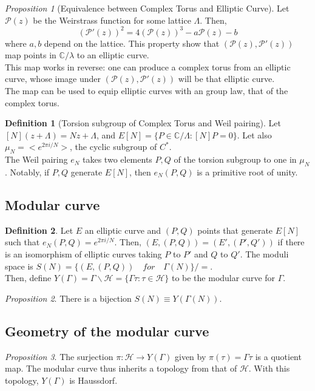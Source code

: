 \documentclass[11pt]{article}
\theoremstyle{definition}
\newtheorem{definition}{Definition}[section]
\theoremstyle{example}
\theoremstyle{remark}
\theoremstyle{lemma}
\theoremstyle{proposition}
\newtheorem{proposition}{Proposition}[section]
\theoremstyle{Problem}
\theoremstyle{Solution}
\theoremstyle{theorem}
\begin{document}
\begin{proposition}[Equivalence between Complex Torus and Elliptic Curve]
Let $\mathcal{P}(z)$ be the Weirstrass function for some lattice $\Lambda$. Then,
$$ (\mathcal{P}'(z))^2 = 4 (\mathcal{P}(z))^3 - a\mathcal{P}(z) - b$$
where $a,b$ depend on the lattice. This property show that $(\mathcal{P}(z), \mathcal{P}'(z))$ map points in $\mathbb{C}/\lambda$ to an elliptic curve.\\
This map works in reverse: one can produce a complex torus from an elliptic curve, whose image under $(\mathcal{P}(z), \mathcal{P}'(z))$ will be that elliptic curve.\\
The map can be used to equip elliptic curves with an group law, that of the complex torus.
\end{proposition}

\begin{definition}[Torsion subgroup of Complex Torus and Weil pairing]
Let $[N](z+\Lambda) = Nz + \Lambda$, and $E[N] = \{ P\in \mathbb{C}/\Lambda : [N]P = 0\}$. Let also $\mu_N = < e^{2\pi i/ N} >$, the cyclic subgroup of $C^*$.\\
The Weil pairing $e_N$ takes two elements $P,Q$ of the torsion subgroup to one in $\mu_N$. Notably, if $P,Q$ generate $E[N]$, then $e_N(P,Q)$ is a primitive root of unity.
\end{definition}

\subsection{Modular curve}
\begin{definition}
Let $E$ an elliptic curve and $(P,Q)$ points that generate $E[N]$ such that $e_N(P,Q) = e^{2\pi i /N}$. Then, $(E,(P,Q)) = (E', (P', Q'))$ if there is an isomorphism of elliptic curves taking $P$ to $P'$ and $Q$ to $Q'$. The moduli space is $S(N) = \{(E, (P,Q)) \quad for  \quad \Gamma(N)\} / =$.\\
Then, define $Y(\Gamma) = \Gamma \backslash \mathcal{H} = \{ \Gamma\tau : \tau \in \mathcal{H}\}$ to be the modular curve for $\Gamma$.
\end{definition}
\begin{proposition}
There is a bijection $S(N) \equiv Y(\Gamma(N))$.
\end{proposition}


\subsection{Geometry of the modular curve}
\begin{proposition}
The surjection $\pi : \mathcal{H} \to Y(\Gamma)$ given by $\pi(\tau) = \Gamma \tau$ is a quotient map. The modular curve thus inherits a topology from that of $\mathcal{H}$. With this topology, $Y(\Gamma)$ is Haussdorf.  
\end{proposition}
\end{document}

